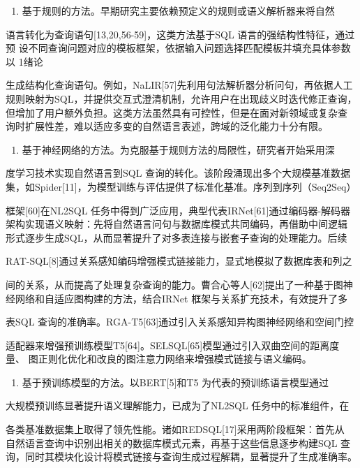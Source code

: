 \documentclass[12pt,a4paper,openright,UTF8]{ctexbook}
\begin{document}
\begin{enumerate}[label=(\arabic*)]
\item 基于规则的方法。早期研究主要依赖预定义的规则或语义解析器来将自然
\end{enumerate}
语言转化为查询语句[13,20,56-59]，这类方法基于SQL 语言的强结构性特征，通过预 设不同查询问题对应的模板框架，依据输入问题选择匹配模板并填充具体参数以 1绪论

生成结构化查询语句。例如，NaLIR[57]先利用句法解析器分析问句，再依据人工 规则映射为SQL，并提供交互式澄清机制，允许用户在出现歧义时迭代修正查询， 但增加了用户额外负担。这类方法虽然具有可控性，但是在面对新领域或复杂查 询时扩展性差，难以适应多变的自然语言表述，跨域的泛化能力十分有限。

\begin{enumerate}[label=(\arabic*)]
\item 基于神经网络的方法。为克服基于规则方法的局限性，研究者开始采用深
\end{enumerate}
度学习技术实现自然语言到SQL 查询的转化。该阶段涌现出多个大规模基准数据 集，如Spider[11]，为模型训练与评估提供了标准化基准。序列到序列（Seq2Seq）

框架[60]在NL2SQL 任务中得到广泛应用，典型代表IRNet[61]通过编码器-解码器 架构实现语义映射：先将自然语言问句与数据库模式共同编码，再借助中间逻辑 形式逐步生成SQL，从而显著提升了对多表连接与嵌套子查询的处理能力。后续

RAT-SQL[8]通过关系感知编码增强模式链接能力，显式地模拟了数据库表和列之

间的关系，从而提高了处理复杂查询的能力。曹合心等人[62]提出了一种基于图神 经网络和自适应图构建的方法，结合IRNet 框架与关系扩充技术，有效提升了多

表SQL 查询的准确率。RGA-T5[63]通过引入关系感知异构图神经网络和空间门控

适配器来增强预训练模型T5[64]。SELSQL[65]模型通过引入双曲空间的距离度量、 图正则化优化和改良的图注意力网络来增强模式链接与语义编码。

\begin{enumerate}[label=(\arabic*)]
\item 基于预训练模型的方法。以BERT[5]和T5 为代表的预训练语言模型通过
\end{enumerate}
大规模预训练显著提升语义理解能力，已成为了NL2SQL 任务中的标准组件，在

各类基准数据集上取得了领先性能。诸如REDSQL[17]采用两阶段框架：首先从 自然语言查询中识别出相关的数据库模式元素，再基于这些信息逐步构建SQL 查 询，同时其模块化设计将模式链接与查询生成过程解耦，显著提升了生成准确率。
\end{document}
